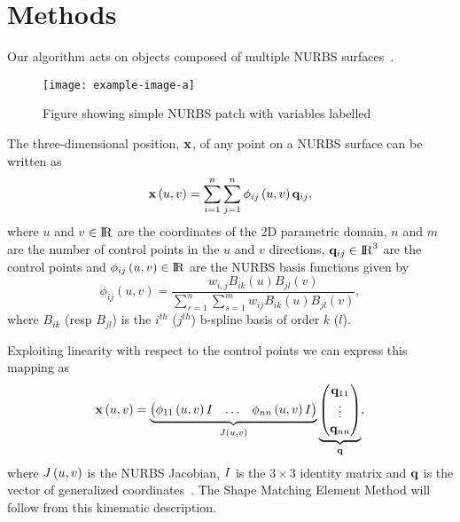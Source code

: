 \section{Methods}

Our algorithm acts on objects composed of multiple NURBS surfaces~.

\begin{figure}
    \texttt{[image: example-image-a]}
    \caption{Figure showing simple NURBS patch with variables labelled}
    \label{fig:NURBS}
\end{figure}

The three-dimensional position, $\mathbf{x}$, of any point on a NURBS surface can be written as 
\begin{equation}
\label{eqn:nurbs_srf}
\mathbf{x}\left(u,v\right) = \sum_{i=1}^n\sum_{j=1}^n \phi_{ij}\left(u,v\right)\mathbf{q}_{ij},
\end{equation}
where $u$ and $v$ $\in {\rm I\!R}$ are the coordinates of the 2D parametric domain, $n$ and $m$ are the number of control points in the $u$ and $v$ directions, $\mathbf{q}_{ij}\in{\rm I\!R}^3$ are the control points and $\phi_{ij}\left(u,v\right)\in{\rm I\!R}$ are the NURBS
basis functions given by 
\begin{equation*}
    \phi_{ij}\left(u,v\right) = \frac{w_{i,j}B_{ik}(u)B_{jl}(v)}{\sum_{r=1}^{n}\sum_{s=1}^{m} w_{ij} B_{ik}(u)B_{jl}(v)},
\end{equation*} where $B_{ik}$ (resp $B_{jl}$) is the $i^{th}$ ($j^{th}$) b-spline basis of order $k$ ($l$). 

Exploiting linearity with respect to the control points  we can express this mapping as 
\begin{equation}
    \mathbf{x}\left(u,v\right) = \underbrace{\begin{pmatrix} \phi_{11}\left(u,v\right)I & \dots & \phi_{nn}\left(u,v\right)I \end{pmatrix}}_{J\left(u,v\right)}
    \underbrace{\begin{pmatrix} \mathbf{q}_{11} \\ \vdots \\ \mathbf{q}_{nn}\end{pmatrix}}_{\mathbf{q}},
\end{equation} where $J\left(u,v\right)$ is the NURBS Jacobian, $I$ is the $3\times3$ identity matrix and $\mathbf{q}$ is the vector of generalized coordinates~.
The Shape Matching Element Method will follow from this kinematic description.

